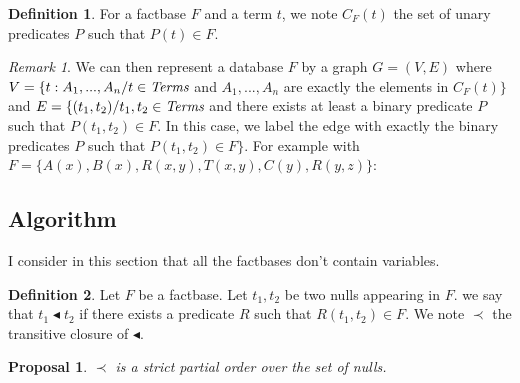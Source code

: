 \documentclass{article}
\newtheorem{proposal}{Proposal}[section]
\theoremstyle{definition}
\newtheorem{definition}{Definition}[section]
\theoremstyle{remark}
\newtheorem{remark}{Remark}[section]
\begin{document}
\begin{definition}
For a factbase $F$ and a term $t$, we note $C_F(t)$ the set of unary predicates $P$ such that $P(t)\in F$.
\end{definition}

\begin{remark}
We can then represent a database $F$ by a graph $G = (V,E)$ where $V = \{t:A_1,...,A_n /t \in \emph{Terms}$ and $A_1,...,A_n$ are exactly the elements in $C_F(t)\}$ and $E = \{(t_1,t_2) /t_1,t_2 \in \emph{Terms}$ and there exists at least a binary predicate $P$ such that $P(t_1,t_2) \in F$. In this case, we label the edge with exactly the binary predicates $P$ such that $P(t_1,t_2) \in F\}$. For example with $F = \{A(x), B(x),R(x,y),T(x,y),C(y),R(y,z)\}$: \\

\end{remark}

\subsection{Algorithm}

I consider in this section that all the factbases don't contain variables.

\begin{definition}
Let $F$ be a factbase. Let $t_1,t_2$ be two nulls appearing in $F$. we say that $t_1 \blacktriangleleft t_2$ if there exists a predicate $R$ such that $R(t_1,t_2) \in F$. We note $\prec$ the transitive closure of $\blacktriangleleft$. 
\end{definition}

\begin{proposal}
$\prec$ is a strict partial order over the set of nulls.
\end{proposal}
\end{document}
